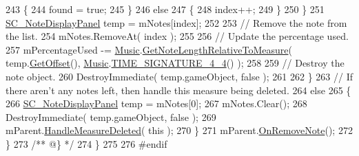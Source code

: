\begin{DoxyCodeInclude}
243                 \{
244                     found = \textcolor{keyword}{true};
245                 \}
246                 \textcolor{keywordflow}{else}
247                 \{
248                     index++;
249                 \}
250             \}
251             \hyperlink{class_s_c___note_display_panel}{SC\_NoteDisplayPanel} temp = mNotes[index];
252 
253             \textcolor{comment}{// Remove the note from the list.}
254             mNotes.RemoveAt( index );
255 
256             \textcolor{comment}{// Update the percentage used.}
257             mPercentageUsed -= \hyperlink{class_music}{Music}.\hyperlink{group___music_stat_func_ga91e290b48ad2289493ba4421308abe49}{GetNoteLengthRelativeToMeasure}( 
      temp.\hyperlink{group___s_c___n_d_p_unity_ga371654221730812200062322c8a3e750}{GetOffset}(), \hyperlink{class_music}{Music}.\hyperlink{group___music_stat_func_gac95af323eef7511543c799154e1c29fd}{TIME\_SIGNATURE\_4\_4}() );
258 
259             \textcolor{comment}{// Destroy the note object.}
260             DestroyImmediate( temp.gameObject, \textcolor{keyword}{false} );
261 
262         \}
263         \textcolor{comment}{// If there aren't any notes left, then handle this measure being deleted.}
264         \textcolor{keywordflow}{else}
265         \{
266             \hyperlink{class_s_c___note_display_panel}{SC\_NoteDisplayPanel} temp = mNotes[0];
267             mNotes.Clear();
268             DestroyImmediate( temp.gameObject, \textcolor{keyword}{false} );
269             mParent.\hyperlink{group___s_c___n_d_c_handlers_ga40ffb2c779af43930924348c265c9e09}{HandleMeasureDeleted}( \textcolor{keyword}{this} );
270         \}
271         mParent.\hyperlink{group___s_c___n_d_c_handlers_ga6dbbf12e55681d13f43e489dd4a100dc}{OnRemoveNote}();
272     \}\textcolor{comment}{}
273 \textcolor{comment}{    /** @\} */}
274 \}
275 
276 \textcolor{preprocessor}{#endif}
\end{DoxyCodeInclude}
 